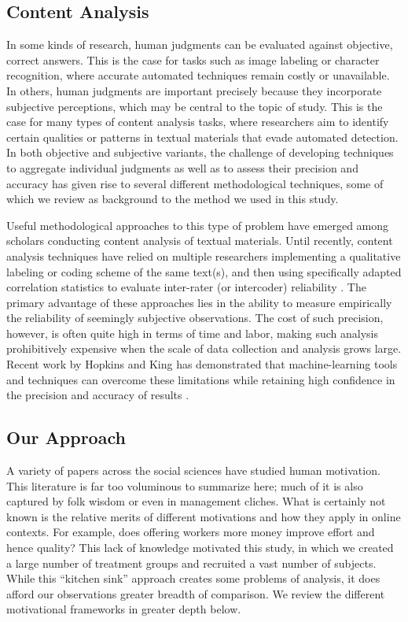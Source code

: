 \documentclass{cscw2010}
\begin{document}
\subsection{Content Analysis}
In some kinds of research, human judgments can be evaluated against
objective, correct answers. This is the case for tasks such as image
labeling or character recognition, where accurate automated techniques
remain costly or unavailable. In others, human judgments are important
precisely because they incorporate subjective perceptions, which may
be central to the topic of study. This is the case for many types of
content analysis tasks, where researchers aim to identify certain
qualities or patterns in textual materials that evade automated
detection. In both objective and subjective variants, the challenge of
developing techniques to aggregate individual judgments as well as to
assess their precision and accuracy has given rise to several
different methodological techniques, some of which we review as
background to the method we used in this study.

Useful methodological approaches to this type of problem have emerged
among scholars conducting content analysis of textual materials. Until
recently, content analysis techniques have relied on multiple
researchers implementing a qualitative labeling or coding scheme of
the same text(s), and then using specifically adapted correlation
statistics to evaluate inter-rater (or intercoder) reliability
\cite{krippendorff_content_2003, cohen_coefficient_1960}. The primary
advantage of these approaches lies in the ability to measure
empirically the reliability of seemingly subjective observations. The
cost of such precision, however, is often quite high in terms of time
and labor, making such analysis prohibitively expensive when the scale
of data collection and analysis grows large. Recent work by Hopkins
and King has demonstrated that machine-learning tools and techniques
can overcome these limitations while retaining high
confidence in the precision and accuracy of results
\cite{Hopkins-King2010}.

\subsection{Our Approach} 
A variety of papers across the social sciences have studied
human motivation. This literature is far too voluminous to summarize
here; much of it is also captured by folk wisdom or even in management
cliches. What is certainly not known is the relative merits of
different motivations and how they apply in online contexts. For
example, does offering workers more money improve effort and hence
quality? This lack of knowledge motivated this study, in which we
created a large number of treatment groups and recruited a vast number
of subjects. While this ``kitchen sink'' approach creates some
problems of analysis, it does afford our observations greater breadth
of comparison. We review the different motivational frameworks in greater
depth below.
\end{document}
